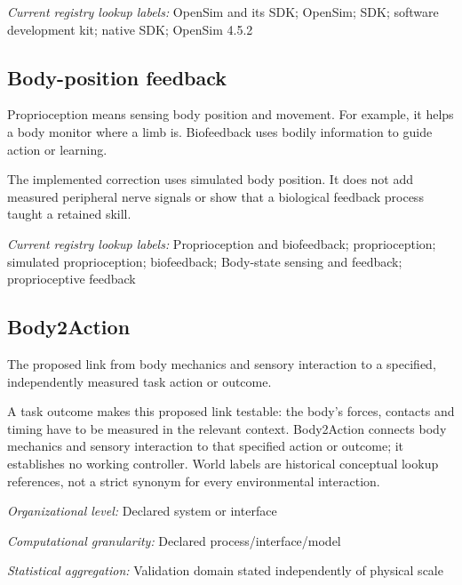 \noindent\textit{Current registry lookup labels:} OpenSim and its SDK; OpenSim; SDK; software development kit; native SDK; OpenSim 4.5.2\par

\begin{samepage}
\subsection*{Body-position feedback}
\noindent Proprioception means sensing body position and movement. For example, it helps a body monitor where a limb is. Biofeedback uses bodily information to guide action or learning.\par
\end{samepage}
\begin{samepage}
\noindent The implemented correction uses simulated body position. It does not add measured peripheral nerve signals or show that a biological feedback process taught a retained skill.\par\nopagebreak[4]

\end{samepage}


\noindent\textit{Current registry lookup labels:} Proprioception and biofeedback; proprioception; simulated proprioception; biofeedback; Body-state sensing and feedback; proprioceptive feedback\par

\begin{samepage}
\subsection*{Body2Action}
\noindent The proposed link from body mechanics and sensory interaction to a specified, independently measured task action or outcome.\par
\end{samepage}
\noindent A task outcome makes this proposed link testable: the body’s forces, contacts and timing have to be measured in the relevant context. Body2Action connects body mechanics and sensory interaction to that specified action or outcome; it establishes no working controller. World labels are historical conceptual lookup references, not a strict synonym for every environmental interaction.\par
\noindent\textit{Organizational level:} Declared system or interface\par
\noindent\textit{Computational granularity:} Declared process/interface/model\par
\begin{samepage}
\noindent\textit{Statistical aggregation:} Validation domain stated independently of physical scale\par\nopagebreak[4]

\end{samepage}


